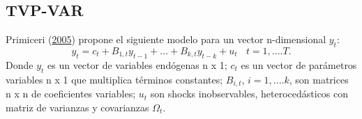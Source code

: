 \documentclass[12pt,oneside]{reedthesis}
\begin{document}
\hypertarget{tvp-var}{%
\subsection{TVP-VAR}\label{tvp-var}}

Primiceri (\protect\hyperlink{ref-Primiceri2005}{2005}) propone el siguiente modelo para un vector n-dimensional \(y_t\):
\begin{equation}
y_t = c_t + B_{1,t}y_{t-1} + ...+ B_{k,t}y_{t-k} + u_t \ \ \ \ t = 1,....T.
\label{eq:var-reducido}
\end{equation}
Donde \(y_t\) es un vector de variables endógenas n x 1; \(c_t\) es un vector de parámetros variables n x 1 que multiplica términos constantes; \(B_{i,t}\), \(i = 1,....k\), son matrices n x n de coeficientes variables; \(u_t\) son shocks inobservables, heterocedásticos con matriz de varianzas y covarianzas \(\Omega_t\).
\end{document}
